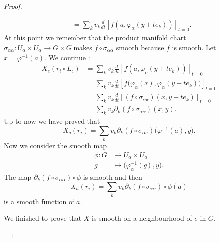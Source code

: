 \begin{proof}
\begin{subproof}
\begin{subequations}
\begin{align}
				                  & =\sum_kv_k\frac{d}{dt} \left[ f(a,\varphi_{\alpha}(y+te_k))  \right]_{t=0}.
			\end{align}
		\end{subequations}
		At this point we remember that the product manifold chart \(\sigma_{\alpha\alpha} \colon U_{\alpha}\times U_{\alpha}\to G\times G  \) makes \( f\circ\sigma_{\alpha\alpha}\) smooth because \( f\) is smooth. Let \( x=\varphi^{-1}(a)\). We continue :
		\begin{subequations}
			\begin{align}
				X_e(r_i\circ L_a) & =\sum_kv_k\frac{d}{dt} \left[ f(a,\varphi_{\alpha}(y+te_k))  \right]_{t=0}                              \\
				                  & = \sum_kv_k\frac{d}{dt} \left[ f\big( \varphi_{\alpha}(x),\varphi_{\alpha}(y+te_k) \big)  \right]_{t=0} \\
				                  & =\sum_kv_k\frac{d}{dt} \left[ (f\circ\sigma_{\alpha\alpha})(x,y+te_k)  \right]_{t=0}                    \\
				                  & =\sum_kv_k\partial_k(f\circ\sigma_{\alpha\alpha})(x,y).
			\end{align}
		\end{subequations}
		Up to now we have proved that
		\begin{equation}
			X_a(r_i)=\sum_kv_k\partial_k(f\circ\sigma_{\alpha\alpha})\big( \varphi^{-1}(a),y \big).
		\end{equation}
		Now we consider the smooth map
		\begin{equation}
			\begin{aligned}
				\phi\colon G & \to U_{\alpha}\times U_{\alpha}                 \\
				g            & \mapsto \big( \varphi_{\alpha}^{-1}(g),y \big).
			\end{aligned}
		\end{equation}
		The map \( \partial_k(f\circ\sigma_{\alpha\alpha})\circ \phi\) is smooth and then
		\begin{equation}
			X_a(r_i)=\sum_kv_k\partial_k(f\circ\sigma_{\alpha\alpha})\circ\phi(a)
		\end{equation}
		is a smooth function of \( a\).

		We finished to prove that \( X\) is smooth on a neighbourhood of \( e\) in \( G\).


\end{subproof}
\end{proof}
